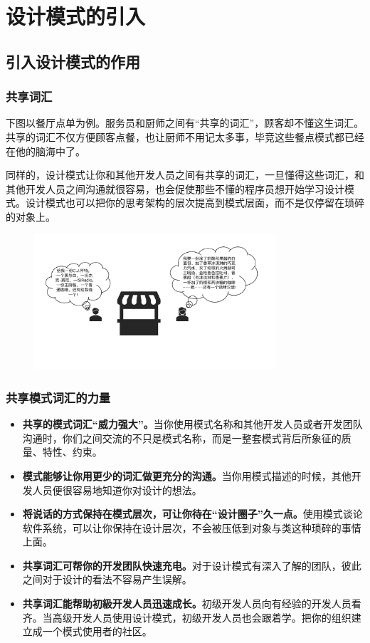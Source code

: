 \section{设计模式的引入}

\subsection{引入设计模式的作用}

\subsubsection{共享词汇}
下图以餐厅点单为例。服务员和厨师之间有“共享的词汇”，顾客却不懂这生词汇。共享的词汇不仅方便顾客点餐，也让厨师不用记太多事，毕竞这些餐点模式都已经在他的脑海中了。

同样的，设计模式让你和其他开发人员之间有共享的词汇，一旦懂得这些词汇，和其他开发人员之间沟通就很容易，也会促使那些不懂的程序员想开始学习设计模式。设计模式也可以把你的思考架构的层次提高到模式层面，而不是仅停留在琐碎的对象上。

\begin{figure}[H]
    \vspace{-0.5em}
	\centering
	\includegraphics[width=0.8\textwidth]{images/共享词汇.pdf}
    \vspace{-1em}
\end{figure}

\subsubsection{共享模式词汇的力量}
\begin{itemize}
    \item \textbf{共享的模式词汇“威力强大”。}当你使用模式名称和其他开发人员或者开发团队沟通时，你们之间交流的不只是模式名称，而是一整套模式背后所象征的质量、特性、约束。
    \item \textbf{模式能够让你用更少的词汇做更充分的沟通。}当你用模式描述的时候，其他开发人员便很容易地知道你对设计的想法。
    \item \textbf{将说话的方式保持在模式层次，可让你待在“设计圈子”久一点。}使用模式谈论软件系统，可以让你保持在设计层次，不会被压低到对象与类这种琐碎的事情上面。
    \item \textbf{共享词汇可帮你的开发团队快速充电。}对于设计模式有深入了解的团队，彼此之间对于设计的看法不容易产生误解。
    \item \textbf{共享词汇能帮助初級开发人员迅速成长。}初级开发人员向有经验的开发人员看齐。当高级开发人员使用设计模式，初级开发人员也会跟着学。把你的组织建立成一个模式使用者的社区。
\end{itemize}

